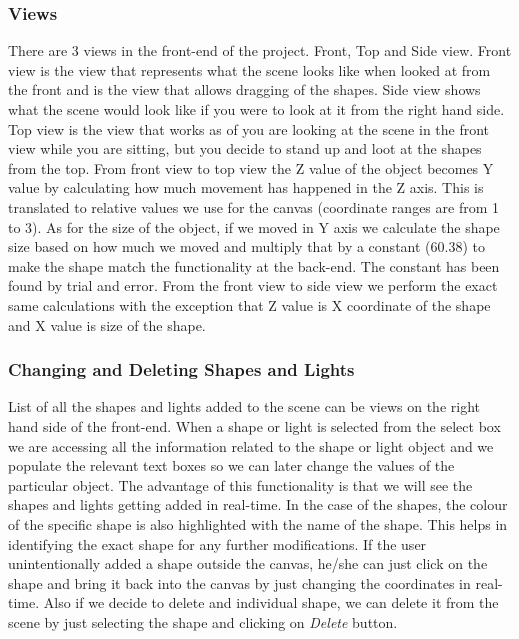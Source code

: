 \documentclass[10pt]{scrartcl}
\begin{document}
\subsubsection{Views}
There are 3 views in the front-end of the project. Front, Top and Side view. Front view is the view that represents what the scene looks like when looked at from the front and is the view that allows dragging of the shapes. Side view shows what the scene would look like if you were to look at it from the right hand side. Top view is the view that works as of you are looking at the scene in the front view while you are sitting, but you decide to stand up and loot at the shapes from the top. From front view to top view the Z value of the object becomes Y value by calculating how much movement has happened in the Z axis. This is translated to relative values we use for the canvas (coordinate ranges are from 1 to 3). As for the size of the object, if we moved in Y axis we calculate the shape size based on how much we moved and multiply that by a constant (60.38) to make the shape match the functionality at the back-end. The constant has been found by trial and error. From the front view to side view we perform the exact same calculations with the exception that Z value is X coordinate of the shape and X value is size of the shape. 

\subsubsection{Changing and Deleting Shapes and Lights}
List of all the shapes and lights added to the scene can be views on the right hand side of the front-end. When a shape or light is selected from the select box we are accessing all the information related to the shape or light object and we populate the relevant text boxes so we can later change the values of the particular object. The advantage of this functionality is that we will see the shapes and lights getting added in real-time. In the case of the shapes, the colour of the specific shape is also highlighted with the name of the shape. This helps in identifying the exact shape for any further modifications. If the user unintentionally added a shape outside the canvas, he/she can just click on the shape and bring it back into the canvas by just changing the coordinates in real-time. Also if we decide to delete and individual shape, we can delete it from the scene by just selecting the shape and clicking on \textit{Delete} button. \par
\end{document}
